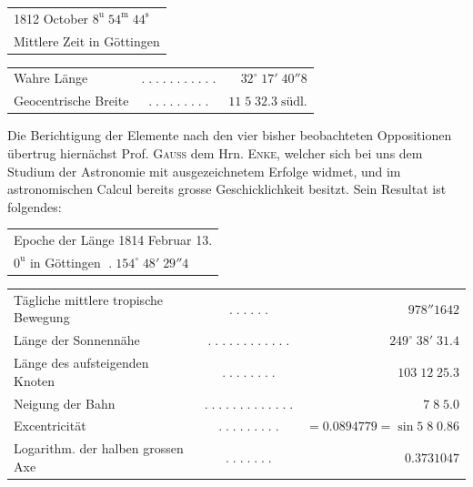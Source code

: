 \medskip
\begin{center}\fontsize{10}{12}\selectfont\setlength{\tabcolsep}{2pt}\renewcommand{\arraystretch}{1.15}\begin{tabular}{l}
1812 October $8^{\mathrm u}\;54^{\mathrm m}\;44^{\mathrm s}$\\Mittlere Zeit in Göttingen
\end{tabular}\end{center}
\begin{center}\fontsize{10}{12}\selectfont\setlength{\tabcolsep}{2pt}\renewcommand{\arraystretch}{1.15}\begin{tabular}{lcr}
Wahre Länge & $.\;.\;.\;.\;.\;.\;.\;.\;.\;.\;.$ & $32^\circ\;17'\;40''8$\\
Geocentrische Breite & $.\;.\;.\;.\;.\;.\;.\;.\;.$ & $11\;5\;32.3\;\text{südl.}$\\
\end{tabular}\end{center}

\par\indent Die Berichtigung der Elemente nach den vier bisher beobachteten Oppositionen übertrug hiernächst
Prof. \textsc{Gauss} dem Hrn. \textsc{Enke}, welcher sich bei uns dem Studium der Astronomie mit ausgezeichnetem Erfolge
widmet, und im astronomischen Calcul bereits grosse Geschicklichkeit besitzt. Sein Resultat ist
folgendes:

\medskip
\begin{center}\fontsize{10}{12}\selectfont\setlength{\tabcolsep}{2pt}\renewcommand{\arraystretch}{1.15}\begin{tabular}{l}
Epoche der Länge 1814 Februar 13.\\$0^{\mathrm u}$ in Göttingen $\; .\; 154^\circ\;48'\;29''4$
\end{tabular}\end{center}
\begin{center}\fontsize{9}{11}\selectfont\setlength{\tabcolsep}{2pt}\renewcommand{\arraystretch}{1.15}\begin{tabular}{lcr}
Tägliche mittlere tropische Bewegung & $.\;.\;.\;.\;.\;.$ & $978''1642$\\
Länge der Sonnennähe & $.\;.\;.\;.\;.\;.\;.\;.\;.\;.\;.\;.$ & $249^\circ\;38'\;31.4$\\
Länge des aufsteigenden Knoten & $.\;.\;.\;.\;.\;.\;.\;.$ & $103\;12\;25.3$\\
Neigung der Bahn & $.\;.\;.\;.\;.\;.\;.\;.\;.\;.\;.\;.\;.$ & $7\;8\;5.0$\\
Excentricität & $.\;.\;.\;.\;.\;.\;.\;.\;.$ & $=0.0894779=\sin 5\;8\;0.86$\\
Logarithm. der halben grossen Axe & $.\;.\;.\;.\;.\;.\;.$ & $0.3731047$\\
\end{tabular}\end{center}

